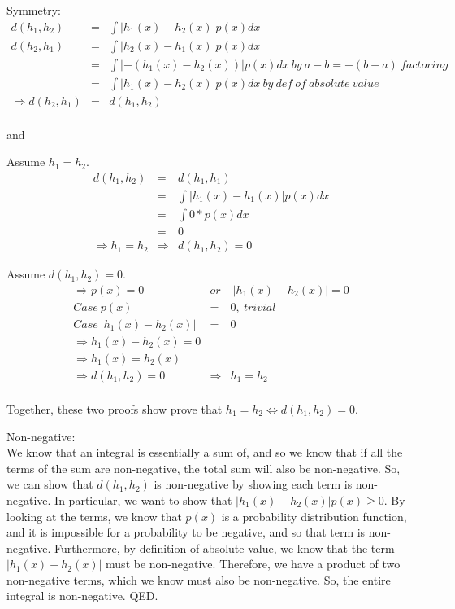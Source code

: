 \documentclass[11pt]{article}
\begin{document}
Symmetry:\\
\begin{eqnarray*}
d(h_1, h_2) &=& \int |h_1(x) - h_2(x)|p(x)dx\\
d(h_2, h_1) &=& \int |h_2(x) - h_1(x)|p(x)dx\\
&=& \int |-(h_1(x) - h_2(x))|p(x)dx \ by \ a-b = -(b-a) \ factoring\\
&=& \int |h_1(x) - h_2(x)|p(x)dx \ by \ def \ of \ absolute \ value\\
\Rightarrow d(h_2, h_1) &=& d(h_1, h_2)\\
\end{eqnarray*}

and

Assume $h_1 = h_2$.
\begin{eqnarray*}
d(h_1, h_2) &=&  d(h_1, h_1)\\
&=& \int |h_1(x) - h_1(x)|p(x)dx\\
&=& \int 0*p(x)dx\\
&=& 0\\
\Rightarrow h_1 = h_2 &\Rightarrow& d(h_1, h_2) = 0
\end{eqnarray*}

Assume $d(h_1, h_2) = 0$.
\begin{eqnarray*}
\Rightarrow p(x) = 0 \ &or& \ |h_1(x) - h_2(x)| = 0\\
Case \ p(x) &=& 0, \ trivial\\
Case \ |h_1(x) - h_2(x)| &=& 0\\
\Rightarrow h_1(x) - h_2(x) = 0\\
\Rightarrow h_1(x) = h_2(x)\\
\Rightarrow d(h_1, h_2) = 0 &\Rightarrow&  h_1 = h_2\\
\end{eqnarray*}

Together, these two proofs show prove that $h_1 = h_2 \iff d(h_1, h_2) = 0$. 



Non-negative:\\
We know that an integral is essentially a sum of, and so we know that if all the terms of the sum are non-negative, the total sum will also be non-negative. So, we can show that $d(h_1, h_2)$ is non-negative by showing each term is non-negative. In particular, we want to show that $|h_1(x) - h_2(x)|p(x) \geq 0$. By looking at the terms, we know that $p(x)$ is a probability distribution function, and it is impossible for a probability to be negative, and so that term is non-negative. Furthermore, by definition of absolute value, we know that the term $|h_1(x) - h_2(x)|$ must be non-negative. Therefore, we have a product of two non-negative terms, which we know must also be non-negative. So, the entire integral is non-negative. QED.
\end{document}
